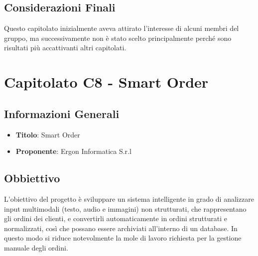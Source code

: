 \documentclass[a4paper,12pt]{article}
\begin{document}
    \subsection{Considerazioni Finali}
    Questo capitolato inizialmente aveva attirato l’interesse di alcuni membri del gruppo, ma successivamente non è stato scelto principalmente perché sono risultati più accattivanti altri capitolati.


    \section{Capitolato C8 - Smart Order}
    \subsection{Informazioni Generali}
        \begin{itemize}
            \item \textbf{Titolo}: Smart Order
            \item \textbf{Proponente}: Ergon Informatica S.r.l
        \end{itemize}
    \subsection{Obbiettivo}
    L’obiettivo del progetto è sviluppare un sistema intelligente in grado di analizzare input multimodali (testo, audio e immagini) non strutturati, che rappresentano gli ordini dei clienti, e convertirli automaticamente in ordini strutturati e normalizzati, così che possano essere archiviati all’interno di un database. In questo modo si riduce notevolmente la mole di lavoro richiesta per la gestione manuale degli ordini.
\end{document}
